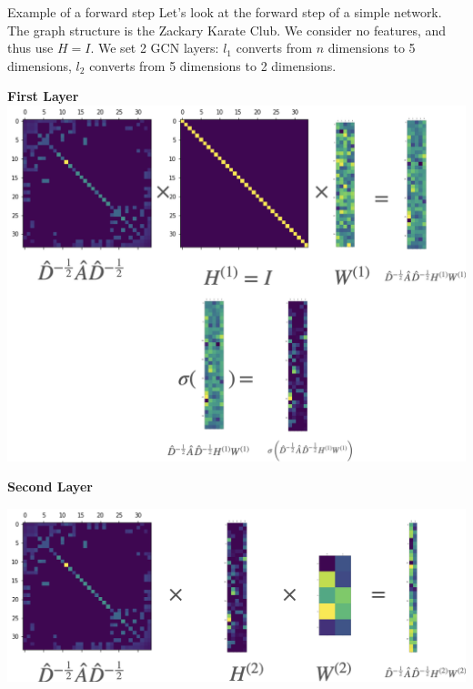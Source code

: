 \documentclass[a4paper,11pt]{book}
\begin{document}
\begin{textbox}{Example of a forward step}
Let's look at the forward step of a simple network. The graph structure is the Zackary Karate Club. We consider no features, and thus use $H=I$. We set 2 GCN layers: $l_1$ converts from $n$ dimensions to 5 dimensions, $l_2$ converts from 5 dimensions to 2 dimensions.

\centering
\textbf{First Layer}
\includegraphics[width=1\linewidth]{pics/forward1.png}
\centering

\textbf{Second Layer}

\includegraphics[width=1\linewidth]{pics/forward2.png}
\end{textbox}
\end{document}

